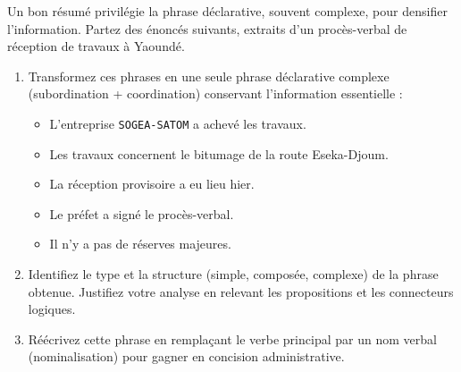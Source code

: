 \documentclass[11pt]{article}
\begin{document}
\begin{exercice}
Un bon résumé privilégie la phrase déclarative, souvent complexe, pour densifier l'information. Partez des énoncés suivants, extraits d'un procès-verbal de réception de travaux à Yaoundé.

\begin{enumerate}
    \item Transformez ces phrases en une seule phrase déclarative complexe (subordination + coordination) conservant l'information essentielle :
    \begin{itemize}
        \item L'entreprise \texttt{SOGEA-SATOM} a achevé les travaux.
        \item Les travaux concernent le bitumage de la route Eseka-Djoum.
        \item La réception provisoire a eu lieu hier.
        \item Le préfet a signé le procès-verbal.
        \item Il n'y a pas de réserves majeures.
    \end{itemize}
    \item Identifiez le type et la structure (simple, composée, complexe) de la phrase obtenue. Justifiez votre analyse en relevant les propositions et les connecteurs logiques.
    \item Réécrivez cette phrase en remplaçant le verbe principal par un nom verbal (nominalisation) pour gagner en concision administrative.
\end{enumerate}
\end{exercice}
\end{document}
